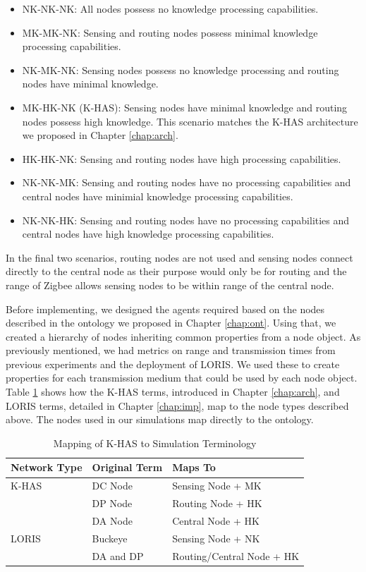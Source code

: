 	\begin{itemize}
		\item NK-NK-NK: All nodes possess no knowledge processing capabilities.
		\item MK-MK-NK: Sensing and routing nodes possess minimal knowledge processing capabilities.
		\item NK-MK-NK: Sensing nodes possess no knowledge processing and routing nodes have minimal knowledge.
		\item MK-HK-NK (K-HAS): Sensing nodes have minimal knowledge and routing nodes possess high knowledge. This scenario matches the K-HAS architecture we proposed in Chapter \ref{chap:arch}.
		\item HK-HK-NK: Sensing and routing nodes have high processing capabilities.
		\item NK-NK-MK: Sensing and routing nodes have no processing capabilities and central nodes have minimial knowledge processing capabilities.
		\item NK-NK-HK: Sensing and routing nodes have no processing capabilities and central nodes have high knowledge processing capabilities.
	\end{itemize}


In the final two scenarios, routing nodes are not used and sensing nodes connect directly to the central node as their purpose would only be for routing and the range of Zigbee allows sensing nodes to be within range of the central node.

Before implementing, we designed the agents required based on the nodes described in the ontology we proposed in Chapter \ref{chap:ont}. Using that, we created a hierarchy of nodes inheriting common properties from a node object. As previously mentioned, we had metrics on range and transmission times from previous experiments and the deployment of LORIS. We used these to create properties for each transmission medium that could be used by each node object. Table \ref{sim:tab:terms} shows how the K-HAS terms, introduced in Chapter \ref{chap:arch}, and LORIS terms, detailed in Chapter \ref{chap:imp}, map to the node types described above. The nodes used in our simulations map directly to the ontology.

\begin{table}[h]
\centering
\begin{tabular}{|l|l|l|}
\hline
\textbf{Network Type} & \textbf{Original Term} & \textbf{Maps To}          \\
\hline
K-HAS                 & DC Node                & Sensing Node + MK         \\
                      & DP Node                & Routing Node + HK         \\
                      & DA Node                & Central Node + HK         \\
LORIS                 & Buckeye                & Sensing Node + NK         \\
                      & DA and DP              & Routing/Central Node + HK \\
\hline
\end{tabular}
\caption{Mapping of K-HAS to Simulation Terminology}
\label{sim:tab:terms}
\end{table}

